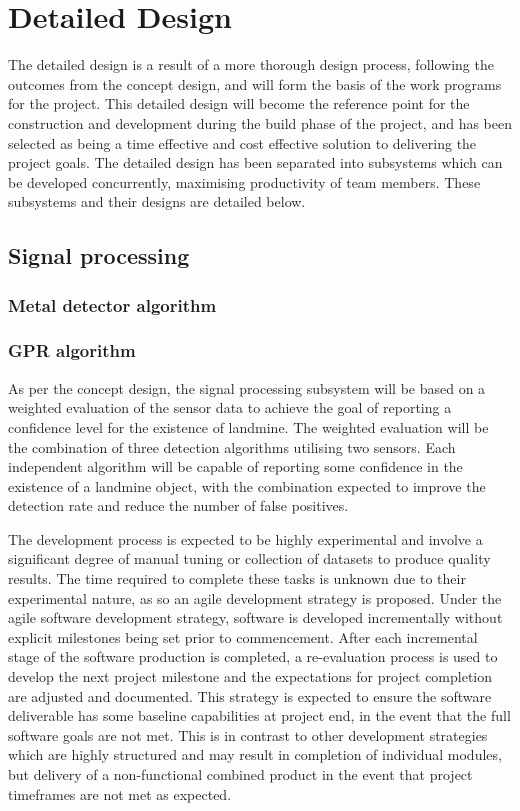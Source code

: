 \documentclass[main.tex]{subfiles}
\begin{document}
\chapter{Detailed Design}

The detailed design is a result of a more thorough design process, following the outcomes from the concept design, and will form the basis of the work programs for the project. This detailed design will become the reference point for the construction and development during the build phase of the project, and has been selected as being a time effective and cost effective solution to delivering the project goals. The detailed design has been separated into subsystems which can be developed concurrently, maximising productivity of team members. These subsystems and their designs are detailed below.
\section{Signal processing}
\subsection{Metal detector algorithm}
\subsection{GPR algorithm}
As per the concept design, the signal processing subsystem will be based on a weighted evaluation of the sensor data to achieve the goal of reporting a confidence level for the existence of landmine.
The weighted evaluation will be the combination of three detection algorithms utilising two sensors. Each independent algorithm will be capable of reporting some confidence in the existence of a landmine object, with the combination expected to improve the detection rate and reduce the number of false positives.

The development process is expected to be highly experimental and involve a significant degree of manual tuning or collection of datasets to produce quality results. The time required to complete these tasks is unknown due to their experimental nature, as so an agile development strategy is proposed. Under the agile software development strategy, software is developed incrementally without explicit milestones being set prior to commencement. After each incremental stage of the software production is completed, a re-evaluation process is used to develop the next project milestone and the expectations for project completion are adjusted and documented. This strategy is expected to ensure the software deliverable has some baseline capabilities at project end, in the event that the full software goals are not met. This is in contrast to other development strategies which are highly structured and may result in completion of individual modules, but delivery of a non-functional combined product in the event that project timeframes are not met as expected.
\end{document}
